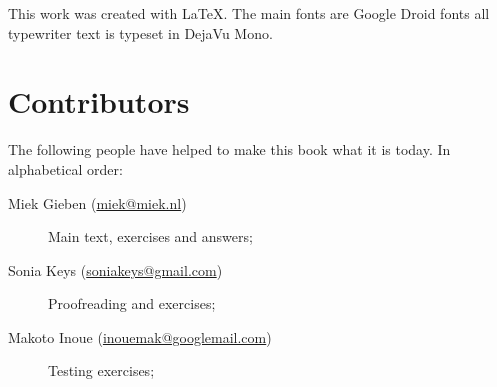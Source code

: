 This work was created with \LaTeX. The main fonts are Google Droid fonts all
typewriter text is typeset in DejaVu Mono.

\section{Contributors}
The following people have helped to make this book what it is today.
In alphabetical order:
\begin{description}
\item[Miek Gieben (\url{miek@miek.nl})] 
{Main text, exercises and answers;}
\item[Sonia Keys (\url{soniakeys@gmail.com})] 
{Proofreading and exercises;}
\item[Makoto Inoue (\url{inouemak@googlemail.com})]
{Testing exercises;}

\end{description}
